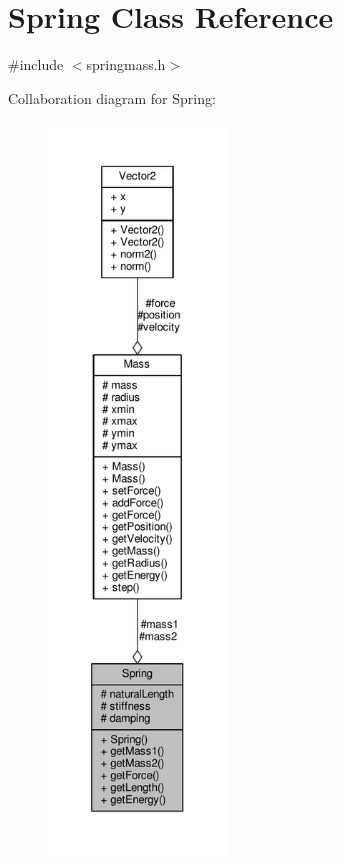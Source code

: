 \hypertarget{classSpring}{}\section{Spring Class Reference}
\label{classSpring}


{\ttfamily \#include $<$springmass.\+h$>$}



Collaboration diagram for Spring\+:
\nopagebreak
\begin{figure}[H]
\begin{center}
\leavevmode
\includegraphics[height=550pt]{classSpring__coll__graph}
\end{center}
\end{figure}
